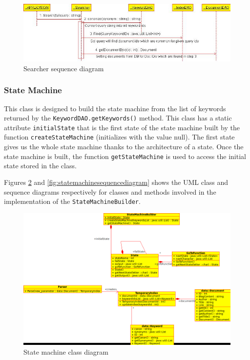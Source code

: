 \documentclass[10pt]{report}
\begin{document}
\begin{figure}
  \begin{center}
        \includegraphics[width=\textwidth,height=!]{searchersequencediagram}
  \end{center}
  \caption{Searcher sequence diagram}
  \label{fig:searchersequencediagram}
\end{figure} 


\subsubsection{State Machine}
This class is designed to build the state machine from the list of
keywords returned by the \texttt{KeywordDAO.getKeywords()} method. This class has a static
attribute \texttt{initialState} that is the first state of the state machine
built by the function \texttt{createStateMachine} (initializes with the value
null). The first state gives us the whole state machine thanks to the
architecture of a state. Once the state machine is built, the function
\texttt{getStateMachine} is used to access the initial state stored in the
class.

Figures \ref{fig:statemachineclassdiagram} and
\ref{fig:statemachinesequencediagram} shows the UML class and sequence
diagrams respectively for classes and methods involved in the
implementation of the \texttt{StateMachineBuilder}.

\begin{figure}
  \begin{center}
        \includegraphics[width=\textwidth,height=!]{statemachineclassdiagram}
  \end{center}
  \caption{State machine class diagram}
  \label{fig:statemachineclassdiagram}
\end{figure} 
\end{document}
